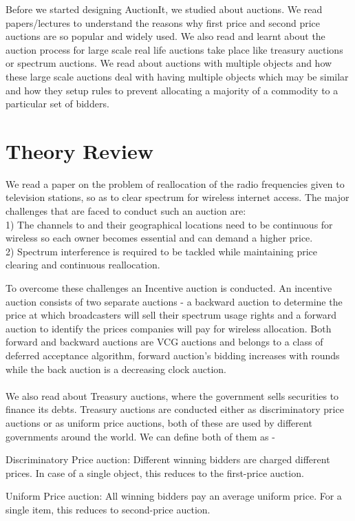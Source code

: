 \documentclass[a4paper]{article}
\begin{document}
Before we started designing AuctionIt, we studied about auctions. We read papers/lectures to understand the reasons why first price and second price auctions are so popular and widely used. We also read and learnt about the auction process for large scale real life auctions take place like treasury auctions or spectrum auctions. We read about auctions with multiple objects and how these large scale auctions deal with having multiple objects which may be similar and how they setup rules to prevent allocating a majority of a commodity to a particular set of bidders.
\section*{Theory Review}


We read a paper on the problem of reallocation of the radio frequencies given to television stations, so as to clear spectrum for wireless internet access. The major challenges that are faced to conduct such an auction are:\\
1) The channels to and their geographical locations need to be continuous for wireless so each owner becomes essential and can demand a higher price.\\
2) Spectrum interference is required to be tackled while maintaining price clearing and continuous reallocation.

To overcome these challenges an Incentive auction is conducted. An incentive auction consists of two separate auctions - a backward auction to determine the price at which broadcasters will sell their spectrum usage rights and a forward auction to identify the prices companies will pay for wireless allocation. Both forward and backward auctions are VCG auctions and belongs to a class of deferred acceptance algorithm, forward auction's bidding increases with rounds while the back auction is a decreasing clock auction.
\\\\
We also read about Treasury auctions, where the government sells securities to finance its debts. Treasury auctions are conducted either as discriminatory price auctions or as uniform price auctions, both of these are used by different governments around the world. We can define both of them as - 

Discriminatory Price auction: Different winning bidders are charged different prices. In case of a single object, this reduces to the first-price auction.

Uniform Price auction: All winning bidders pay an average uniform price. For a single item, this reduces to second-price auction.
\end{document}
